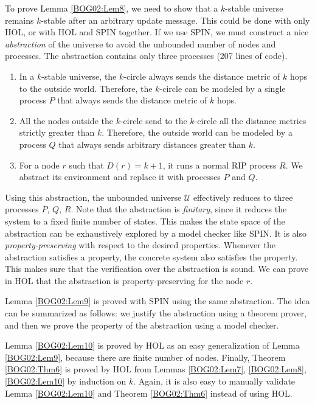 \documentclass[a4paper,10pt,twocolumn]{article}
\begin{document}
To prove Lemma \ref{BOG02:Lem8}, we need to show that a $k$-stable universe remains $k$-stable after an arbitrary update message. This could be done with only HOL, or with HOL and SPIN together. If we use SPIN, we must construct a nice \emph{abstraction} of the universe to avoid the unbounded number of nodes and processes. The abstraction contains only three processes (207 lines of code).
\begin{enumerate}
  \item In a $k$-stable universe, the $k$-circle always sends the distance metric of $k$ hops to the outside world. Therefore, the $k$-circle can be modeled by a single process $P$ that always sends the distance metric of $k$ hops.
  \item All the nodes outside the $k$-circle send to the $k$-circle all the distance metrics strictly greater than $k$. Therefore, the outside world can be modeled by a process $Q$ that always sends arbitrary distances greater than $k$.
  \item For a node $r$ such that $D(r)=k+1$, it runs a normal RIP process $R$. We abstract its environment and replace it with processes $P$ and $Q$.
\end{enumerate}
Using this abstraction, the unbounded universe $\mathcal{U}$ effectively reduces to three processes $P$, $Q$, $R$. Note that the abstraction is \emph{finitary}, since it reduces the system to a fixed finite number of states. This makes the state space of the abstraction can be exhaustively explored by a model checker like SPIN. It is also \emph{property-preserving} with respect to the desired properties. Whenever the abstraction satisfies a property, the concrete system also satisfies the property. This makes sure that the verification over the abstraction is sound. We can prove in HOL that the abstraction is property-preserving for the node $r$.

Lemma \ref{BOG02:Lem9} is proved with SPIN using the same abstraction. The idea can be summarized as follows: we justify the abstraction using a theorem prover, and then we prove the property of the abstraction using a model checker.

Lemma \ref{BOG02:Lem10} is proved by HOL as an easy generalization of Lemma \ref{BOG02:Lem9}, because there are finite number of nodes. Finally, Theorem \ref{BOG02:Thm6} is proved by HOL from Lemmas \ref{BOG02:Lem7}, \ref{BOG02:Lem8}, \ref{BOG02:Lem10} by induction on $k$. Again, it is also easy to manually validate Lemma \ref{BOG02:Lem10} and Theorem \ref{BOG02:Thm6} instead of using HOL.
\end{document}
